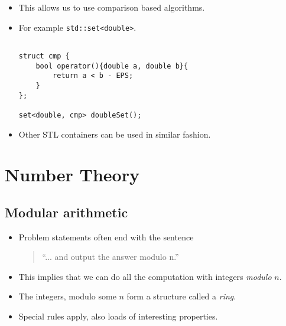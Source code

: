 \documentclass[12pt,t]{beamer}
\newcommand{\bi}{\begin{itemize}}
\newcommand{\ei}{\end{itemize}}
\begin{document}
\begin{frame}[fragile]
  \vspace{30pt}
  \bi
    \item This allows us to use comparison based algorithms.
    \item For example \texttt{std::set<double>}.
      \begin{verbatim}

struct cmp {
    bool operator(){double a, double b}{
        return a < b - EPS;
    }
};

set<double, cmp> doubleSet();
      \end{verbatim}
    \item Other STL containers can be used in similar fashion.
  \ei
\end{frame}


\section{Number Theory}
\subsection{Modular arithmetic}
\begin{frame}[fragile]
  \vspace{40pt}
  \bi
    \item Problem statements often end with the sentence \\
      \vspace{10pt}
      \begin{quote}
``... and output the answer modulo n.''
      \end{quote}
      \vspace{10pt}
    \item This implies that we can do all the computation with integers \emph{modulo }$n$.
    \item The integers, modulo some $n$ form a structure called a \emph{ring}.
    \item Special rules apply, also loads of interesting properties.
  \ei
\end{frame}
\end{document}

